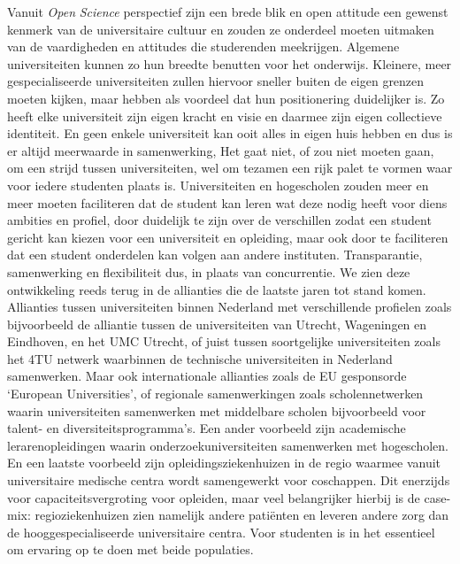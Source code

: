 \documentclass[smallauthor, chapterhaspagenum, nochapterinheader, pagenuminheader,  bigchapnum,medium2, tocpages, garamond, titleinheader]{jote-book}
\begin{document}
	Vanuit \emph{Open }\emph{Science} perspectief zijn een brede blik en open attitude een gewenst kenmerk van de universitaire cultuur en zouden ze onderdeel moeten uitmaken van de vaardigheden en attitudes die studerenden meekrijgen. Algemene universiteiten kunnen zo hun breedte benutten voor het onderwijs. Kleinere, meer gespecialiseerde universiteiten zullen hiervoor sneller buiten de eigen grenzen moeten kijken, maar hebben als voordeel dat hun positionering duidelijker is. Zo heeft elke universiteit zijn eigen kracht en visie en daarmee zijn eigen collectieve identiteit. En geen enkele universiteit kan ooit alles in eigen huis hebben en dus is er altijd meerwaarde in samenwerking, Het gaat niet, of zou niet moeten gaan, om een strijd tussen universiteiten, wel om tezamen een rijk palet te vormen waar voor iedere studenten plaats is. Universiteiten en hogescholen zouden meer en meer moeten faciliteren dat de student kan leren wat deze nodig heeft voor diens ambities en profiel, door duidelijk te zijn over de verschillen zodat een student gericht kan kiezen voor een universiteit en opleiding, maar ook door te faciliteren dat een student onderdelen kan volgen aan andere instituten. Transparantie, samenwerking en flexibiliteit dus, in plaats van concurrentie. We zien deze ontwikkeling reeds terug in de allianties die de laatste jaren tot stand komen. Allianties tussen universiteiten binnen Nederland met verschillende profielen zoals bijvoorbeeld de alliantie tussen de universiteiten van Utrecht, Wageningen en Eindhoven, en het UMC Utrecht, of juist tussen soortgelijke universiteiten zoals het 4TU netwerk waarbinnen de technische universiteiten in Nederland samenwerken. Maar ook internationale allianties zoals de EU gesponsorde ‘European Universities', of regionale samenwerkingen zoals scholennetwerken waarin universiteiten samenwerken met middelbare scholen bijvoorbeeld voor talent- en diversiteitsprogramma's. Een ander voorbeeld zijn academische lerarenopleidingen waarin onderzoekuniversiteiten samenwerken met hogescholen. En een laatste voorbeeld zijn opleidingsziekenhuizen in de regio waarmee vanuit universitaire medische centra wordt samengewerkt voor coschappen. Dit enerzijds voor capaciteitsvergroting voor opleiden, maar veel belangrijker hierbij is de case-mix: regioziekenhuizen zien namelijk andere patiënten en leveren andere zorg dan de hooggespecialiseerde universitaire centra. Voor studenten is in het essentieel om ervaring op te doen met beide populaties.
\end{document}
